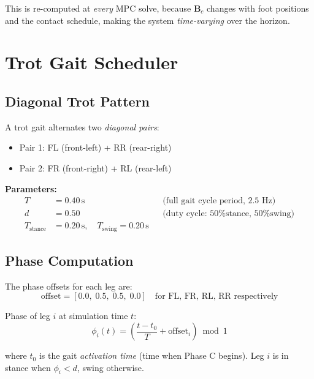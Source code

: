 \documentclass[12pt,a4paper]{report}
\newcommand{\mat}[1]{\mathbf{#1}}
\begin{document}
This is re-computed at \emph{every} MPC solve, because $\mat{B}_c$ changes
with foot positions and the contact schedule, making the system
\emph{time-varying} over the horizon.

\chapter{Trot Gait Scheduler}

\section{Diagonal Trot Pattern}

A trot gait alternates two \emph{diagonal pairs}:
\begin{itemize}[noitemsep]
  \item Pair 1: FL (front-left) + RR (rear-right)
  \item Pair 2: FR (front-right) + RL (rear-left)
\end{itemize}

\noindent\textbf{Parameters:}
\begin{align*}
    T &= 0.40\,\text{s}  \quad &&\text{(full gait cycle period, 2.5 Hz)}\\
    d &= 0.50            \quad &&\text{(duty cycle: 50\% stance, 50\% swing)}\\
    T_\text{stance} &= 0.20\,\text{s}, \quad T_\text{swing} = 0.20\,\text{s}
\end{align*}

\section{Phase Computation}

The phase offsets for each leg are:
\begin{equation}
    \text{offset} = [0.0,\; 0.5,\; 0.5,\; 0.0]
    \quad\text{for FL, FR, RL, RR respectively}
\end{equation}

Phase of leg $i$ at simulation time $t$:
\begin{equation}
    \phi_i(t) = \left(\frac{t - t_0}{T} + \mathrm{offset}_i\right) \bmod 1
    \label{eq:gait_phase}
\end{equation}

where $t_0$ is the gait \emph{activation time} (time when Phase C begins).
Leg $i$ is in stance when $\phi_i < d$, swing otherwise.
\end{document}
